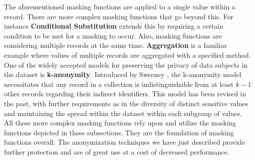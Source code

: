 The aforementioned masking functions are applied to a single value within a record. There are more complex masking functions that go beyond this. For instance \textbf{Conditional Substitution} extends this by requiring a certain condition to be met for a masking to occur. Also, masking functions are considering multiple records at the same time. \textbf{Aggregation} is a familiar example where values of multiple records are aggregated with a specified method. One of the widely accepted models for preserving the privacy of data subjects in the dataset is \textbf{k-anonymity}. Introduced by Sweeney \cite{sweeney2002kanonymity}, the k-anonymity model necessitates that any record in a collection is indistinguishable from at least $k-1$ other records regarding their indirect identifiers. This model has been revised in the past, with further requirements as in the diversity of distinct sensitive values and maintaining the spread within the dataset within each subgroup of values. All these more complex masking functions rely upon and utilize the masking functions depicted in these subsections. They are the foundation of masking functions overall. The anonymization techniques we have just described provide further protection and are of great use at a cost of decreased performance.

